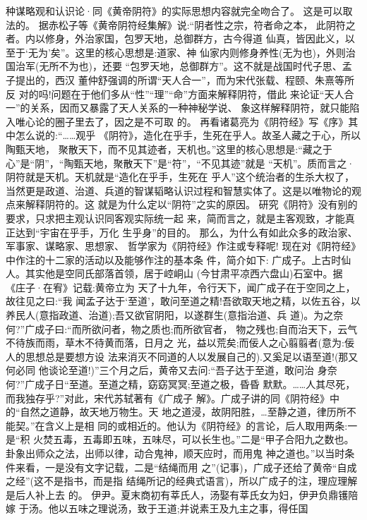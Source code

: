 \documentclass[12pt,UTF8]{ctexbook}
\begin{document}
种谋略观和认识论·同《黄帝阴符》的实际思想内容就完全吻合了。
这是可以取法的。
据赤松子等《黄帝阴符经集解》说:“阴者性之宗，符者命之本，
此阴符之者。内以修身，外治家国，包罗天地，总御群方，古今得道
仙真，皆因此义，以至于‘无为’矣”。这里的核心思想是:道家、神
仙家内则修身养性(无为也)，外则治国治军(无所不为也)，还要
“包罗天地，总御群方”。这不就是战国时代子思、孟子提出的，西汉
董仲舒强调的所谓“天人合一”，而为宋代张载、程颐、朱熹等所反
对的吗!问题在于他们多从“性”“理”“命”方面来解释阴符，借此
来论证“天人合一”的关系，因而又暴露了天人关系的一种神秘学说、
象这样解释阴符，就只能陷入唯心论的圈子里去了，因之是不可取
的。
再看诸葛亮为《阴符经》写《序》其中怎么说的:“……观乎
《阴符》，造化在乎手，生死在乎人。故圣人藏之于心，所以陶甄天地，
聚散天下，而不见其迹者，天机也。”这里的核心思想是:“藏之于
心”是“阴”，“陶甄天地，聚散天下”是“符”，“不见其迹”就是
“天机”。质而言之·阴符就是天机。天机就是“造化在乎手，生死在
乎人”这个统治者的生杀大权了，当然更是政道、治道、兵道的智谋韬略认识过程和智慧实体了。这是以唯物论的观点来解释阴符的。这
就是为什么定以“阴符”之实的原因。
研究《阴符》没有别的要求，只求把主观认识同客观实际统一起
来，简而言之，就是主客观致，才能真正达到“宇宙在乎手，万化
生乎身”的目的。
那么，为什么有如此众多的政治家、军事家、谋略家、思想家、
哲学家为《阴符经》作注或专释呢!
现在对《阴符经》中作注的十二家的活动以及能够作注的基本条
件，简介如下:
广成子。上古时仙人。其实他是空同氏部落首领，居于崆峒山
(今甘肃平凉西六盘山)石室中。据《庄子·在宥》记载:黄帝立为
天了十九年，令行天下，闻广成子在于空同之上，故往见之曰:“我
闻孟子达于‘至道’，敢问至道之精!吾欲取天地之精，以佐五谷，以
养民人(意指政道、治道);吾又欲官阴阳，以遂群生(意指治道、兵
道)。为之奈何?”广成子曰:“而所欲问者，物之质也;而所欲官者，
物之残也;自而治天下，云气不待族而雨，草木不待黄而落，日月之
光，益以荒矣;而佞人之心翦翦者(意为:佞人的思想总是要想方设
法来消灭不同道的人以发展自己的).又奚足以语至道!(那又何必同
他谈论至道!)”三个月之后，黄帝又去问:“吾子达于至道，敢问治
身奈何?”广成子日“至道。至道之精，窈窈冥冥;至道之极，昏昏
默默。……人其尽死，而我独存乎?”对此，宋代苏轼著有《广成子
解》。广成子讲的同《阴符经》中的“自然之道静，故天地万物生。天
地之道浸，故阴阳胜，…至静之道，律历所不能契。”在含义上是相
同的或相近的。他认为《阴符经》的言论，后人取用两条:一是“积
火焚五毒，五毒即五味，五味尽，可以长生也。”二是“甲子合阳九之数也。卦象出师众之法，出师以律，动合鬼神，顺天应时，而用鬼
神之道也。”以当时条件来看，一是没有文字记载，二是“结绳而用
之”(记事)，广成子还给了黄帝“自成之经”(这不是指书，而是指
结绳所记的经典式语言)，所以广成子的注，理应理解是后人补上去
的。
伊尹。夏末商初有莘氏人，汤娶有莘氏女为妇，伊尹负鼎镬陪嫁
于汤。他以五味之理说汤，致于王道;并说素王及九主之事，得任国
\end{document}

